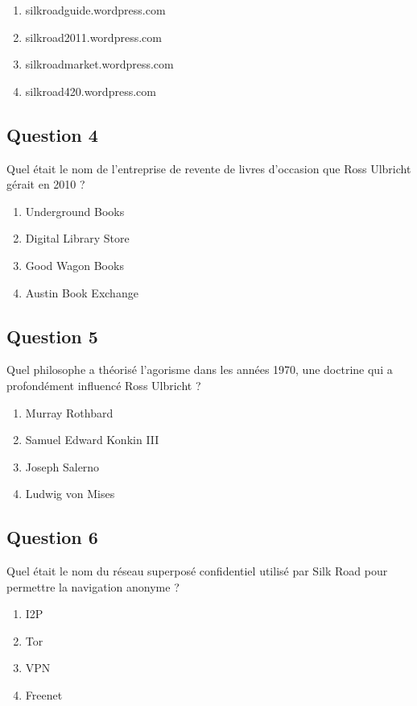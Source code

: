 \documentclass[12pt,a4paper]{article}
\begin{document}
\begin{enumerate}[label=\Alph*., leftmargin=*]
\item silkroadguide.wordpress.com
\item silkroad2011.wordpress.com
\item silkroadmarket.wordpress.com
\item silkroad420.wordpress.com
\end{enumerate}

\bigskip


\subsection*{Question 4}
Quel était le nom de l'entreprise de revente de livres d'occasion que Ross Ulbricht gérait en 2010 ?

\begin{enumerate}[label=\Alph*., leftmargin=*]
\item Underground Books
\item Digital Library Store
\item Good Wagon Books
\item Austin Book Exchange
\end{enumerate}

\bigskip


\subsection*{Question 5}
Quel philosophe a théorisé l'agorisme dans les années 1970, une doctrine qui a profondément influencé Ross Ulbricht ?

\begin{enumerate}[label=\Alph*., leftmargin=*]
\item Murray Rothbard
\item Samuel Edward Konkin III
\item Joseph Salerno
\item Ludwig von Mises
\end{enumerate}

\bigskip


\subsection*{Question 6}
Quel était le nom du réseau superposé confidentiel utilisé par Silk Road pour permettre la navigation anonyme ?

\begin{enumerate}[label=\Alph*., leftmargin=*]
\item I2P
\item Tor
\item VPN
\item Freenet
\end{enumerate}
\end{document}
